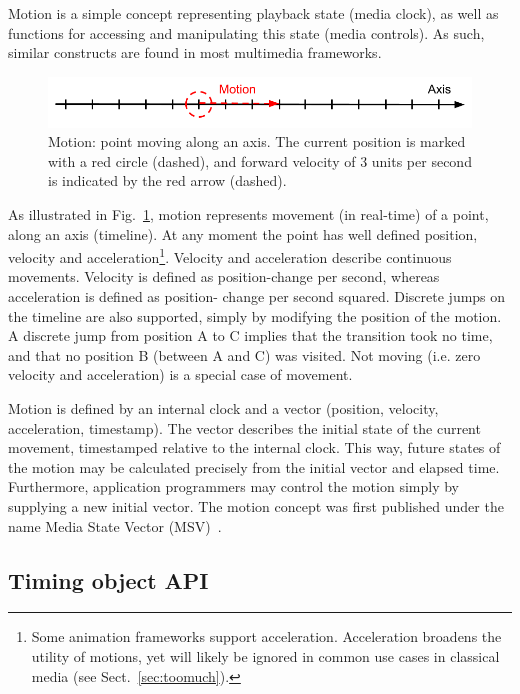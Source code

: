Motion is a simple concept representing playback state (media clock), as well
as functions for accessing and manipulating this state (media controls). As
such, similar constructs are found in most multimedia frameworks.

\begin{figure}[h]
\centering
\includegraphics[scale=.4]{fig/motion-axis.png}
\caption{Motion: point moving along an axis. The current position
is marked with a red circle (dashed), and forward velocity of 3 units per second is
indicated by the red arrow (dashed).}
\label{fig:motion}
\end{figure}

As illustrated in Fig.~\ref{fig:motion}, motion represents movement (in real-time)
of a point, along an axis (timeline). At any moment the point has well
defined position, velocity and acceleration\footnote{Some animation frameworks
support acceleration. Acceleration broadens the utility of motions, yet will
likely be ignored in common use cases in classical media (see
Sect.~\ref{sec:toomuch}).}. Velocity and acceleration describe continuous
movements. Velocity is defined as position-change per second, whereas
acceleration is defined as position- change per second squared. Discrete jumps
on the timeline are also supported, simply by modifying the position of the
motion. A discrete jump from position A to C implies that the transition took
no time, and that no position B (between A and C) was visited. Not moving
(i.e. zero velocity and acceleration) is a special case of movement.

\label{sec:internalstate}
Motion is defined by an internal clock and a vector (position, velocity,
acceleration, timestamp). The vector describes the initial state of the
current movement, timestamped relative to the internal clock. This way, future
states of the motion may be calculated precisely from the initial vector and
elapsed time. Furthermore, application programmers may control the motion
simply by supplying a new initial vector. The motion concept was first
published under the name Media State Vector (MSV)~\cite{msv}.


\subsection{Timing object API}
\label{sec:motionapi}

